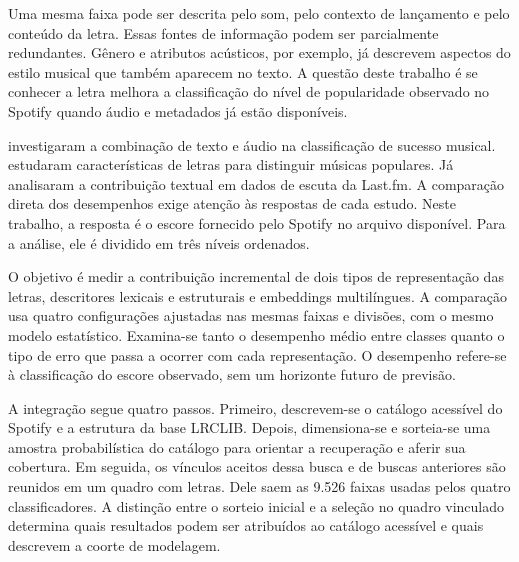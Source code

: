 Uma mesma faixa pode ser descrita pelo som, pelo contexto de lançamento e pelo conteúdo da letra. Essas fontes de informação podem ser parcialmente redundantes. Gênero e atributos acústicos, por exemplo, já descrevem aspectos do estilo musical que também aparecem no texto. A questão deste trabalho é se conhecer a letra melhora a classificação do nível de popularidade observado no Spotify quando áudio e metadados já estão disponíveis.

 investigaram a combinação de texto e áudio na classificação de sucesso musical.  estudaram características de letras para distinguir músicas populares. Já  analisaram a contribuição textual em dados de escuta da Last.fm. A comparação direta dos desempenhos exige atenção às respostas de cada estudo. Neste trabalho, a resposta é o escore fornecido pelo Spotify no arquivo disponível. Para a análise, ele é dividido em três níveis ordenados.

O objetivo é medir a contribuição incremental de dois tipos de representação das letras, descritores lexicais e estruturais e embeddings multilíngues. A comparação usa quatro configurações ajustadas nas mesmas faixas e divisões, com o mesmo modelo estatístico. Examina-se tanto o desempenho médio entre classes quanto o tipo de erro que passa a ocorrer com cada representação. O desempenho refere-se à classificação do escore observado, sem um horizonte futuro de previsão.

A integração segue quatro passos. Primeiro, descrevem-se o catálogo acessível do Spotify e a estrutura da base LRCLIB. Depois, dimensiona-se e sorteia-se uma amostra probabilística do catálogo para orientar a recuperação e aferir sua cobertura. Em seguida, os vínculos aceitos dessa busca e de buscas anteriores são reunidos em um quadro com letras. Dele saem as 9.526 faixas usadas pelos quatro classificadores. A distinção entre o sorteio inicial e a seleção no quadro vinculado determina quais resultados podem ser atribuídos ao catálogo acessível e quais descrevem a coorte de modelagem.

